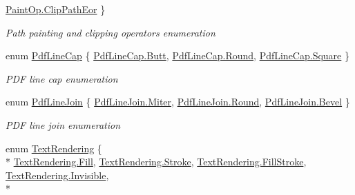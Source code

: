\begin{DoxyCompactItemize}
\hyperlink{namespace_pdf_file_writer_a1bd0bc3fdabed20e2459496f1bbe2101a11337b3ff745332e5b55d7f8a9bff955}{Paint\+Op.\+Clip\+Path\+Eor}
 \}\begin{DoxyCompactList}\small\item\em Path painting and clipping operators enumeration \end{DoxyCompactList}
\item 
enum \hyperlink{namespace_pdf_file_writer_a5bacfcf7dd7ff88412b7b510062d2c1d}{Pdf\+Line\+Cap} \{ \hyperlink{namespace_pdf_file_writer_a5bacfcf7dd7ff88412b7b510062d2c1dab2635ed1075287dea1eb1598a90df1fe}{Pdf\+Line\+Cap.\+Butt}, 
\hyperlink{namespace_pdf_file_writer_a5bacfcf7dd7ff88412b7b510062d2c1dab7f41fc1412ad2ee75e9b2635d3b9d5c}{Pdf\+Line\+Cap.\+Round}, 
\hyperlink{namespace_pdf_file_writer_a5bacfcf7dd7ff88412b7b510062d2c1daceb46ca115d05c51aa5a16a8867c3304}{Pdf\+Line\+Cap.\+Square}
 \}\begin{DoxyCompactList}\small\item\em P\+DF line cap enumeration \end{DoxyCompactList}
\item 
enum \hyperlink{namespace_pdf_file_writer_a6f6d39447d0d063d26d898311f8aafed}{Pdf\+Line\+Join} \{ \hyperlink{namespace_pdf_file_writer_a6f6d39447d0d063d26d898311f8aafedae4396f81cd926bb129ccf3c147c64514}{Pdf\+Line\+Join.\+Miter}, 
\hyperlink{namespace_pdf_file_writer_a6f6d39447d0d063d26d898311f8aafedab7f41fc1412ad2ee75e9b2635d3b9d5c}{Pdf\+Line\+Join.\+Round}, 
\hyperlink{namespace_pdf_file_writer_a6f6d39447d0d063d26d898311f8aafeda1b9ae4ca6d43fc984af318046e1e7bb5}{Pdf\+Line\+Join.\+Bevel}
 \}\begin{DoxyCompactList}\small\item\em P\+DF line join enumeration \end{DoxyCompactList}
\item 
enum \hyperlink{namespace_pdf_file_writer_ab466009e4cbb95b7157a6548dd75914b}{Text\+Rendering} \{ \\*
\hyperlink{namespace_pdf_file_writer_ab466009e4cbb95b7157a6548dd75914badb3e3f51c9107e26c9bccf9a188ce2ed}{Text\+Rendering.\+Fill}, 
\hyperlink{namespace_pdf_file_writer_ab466009e4cbb95b7157a6548dd75914ba8e763d9065582268c9ffa345a3f81f5f}{Text\+Rendering.\+Stroke}, 
\hyperlink{namespace_pdf_file_writer_ab466009e4cbb95b7157a6548dd75914bac9e61bffec481e39c17199129f4c28a7}{Text\+Rendering.\+Fill\+Stroke}, 
\hyperlink{namespace_pdf_file_writer_ab466009e4cbb95b7157a6548dd75914ba8bcda43732b0928d269955e0f09ff76f}{Text\+Rendering.\+Invisible}, 
\\*

\end{DoxyCompactItemize}
